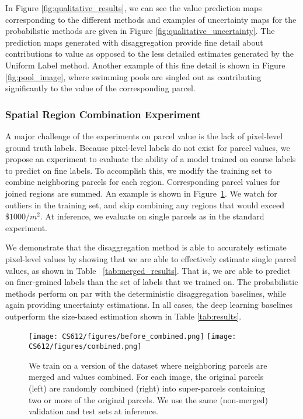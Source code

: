 \documentclass[10pt,twocolumn,letterpaper]{article}
\begin{document}
In Figure \ref{fig:qualitative_results}, we can see the value prediction maps corresponding to the different methods and examples of uncertainty maps for the probabilistic methods are given in Figure \ref{fig:qualitative_uncertainty}. The prediction maps generated with disaggregation provide fine detail about contributions to value as opposed to the less detailed estimates generated by the Uniform Label method. Another example of this fine detail is shown in Figure \ref{fig:pool_image}, where swimming pools are singled out as contributing significantly to the value of the corresponding parcel.



\subsubsection{Spatial Region Combination Experiment}
    \label{sec:merged}
    A major challenge of the experiments on parcel value is the lack of pixel-level ground truth labels. Because pixel-level labels do not exist for parcel values, we propose an experiment to evaluate the ability of a model trained on coarse labels to predict on fine labels. To accomplish this, we modify the training set to combine neighboring parcels for each region. Corresponding parcel values for joined regions are summed. An example is shown in Figure~\ref{fig:basic_results}. We watch for outliers in the training set, and skip combining any regions that would exceed $\$1000/m^2$. At inference, we evaluate on single parcels as in the standard experiment. 
    
    We demonstrate that the disaggregation method is able to accurately estimate pixel-level values by showing that we are able to effectively estimate single parcel values, as shown in Table ~\ref{tab:merged_results}. That is, we are able to predict on finer-grained labels than the set of labels that we trained on. The probabilistic methods perform on par with the deterministic disaggregation baselines, while again providing uncertainty estimations. In all cases, the deep learning baselines outperform the size-based estimation shown in Table \ref{tab:results}.
    
    \begin{figure}[ht]
        \centering
        \texttt{[image: CS612/figures/before\_combined.png]}
        \texttt{[image: CS612/figures/combined.png]}
        \caption{We train on a version of the dataset where neighboring parcels are merged and values combined. For each image, the original parcels (left) are randomly combined (right) into super-parcels containing two or more of the original parcels. We use the same (non-merged) validation and test sets at inference.}
        \label{fig:basic_results}
    \end{figure}
    
\end{document}
